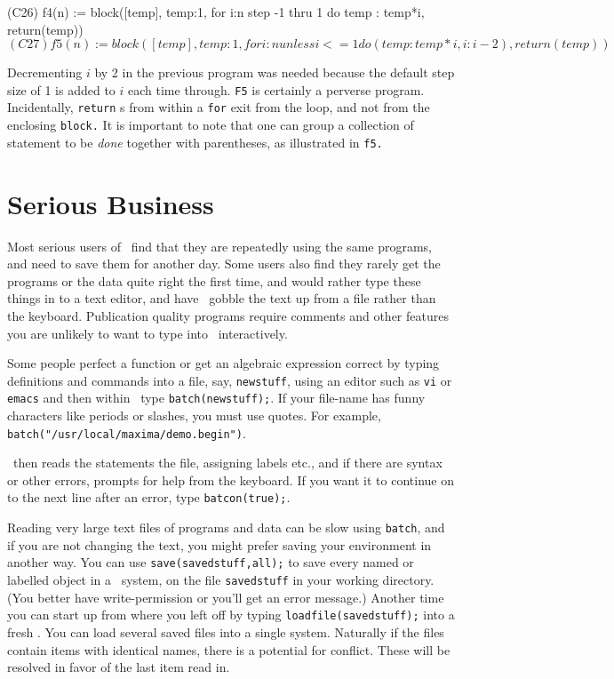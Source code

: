 (C26) f4(n) := block([temp],
                temp:1,
                for i:n step -1 thru 1 do temp : temp*i,
                return(temp))$

(C27) f5(n) := block([temp],
                temp:1,
                for i:n unless i <= 1 do (temp : temp*i , i:i-2),
                return(temp))$

\endmaximasession

Decrementing $i$ by 2 in the previous program was needed because the default
step size of 1 is added to $i$ each time through. {\tt F5}
is certainly
a perverse program.
Incidentally, {\tt return}
s from within a {\tt for}
exit from the loop, and not from
the enclosing 
{\tt block.}
It is important to
note that one can group a collection of statement to be {\it done} together
with parentheses, as illustrated in
{\tt f5.}

\section{Serious Business}

Most serious users of
\Max\
find that they are repeatedly using the same programs, and need to
save them for another day.  Some users also find they rarely get
the programs or the data quite right the first time, and would rather
type these things in to a text editor, and have
\Max\
gobble the text up from a file rather than the keyboard.
Publication quality programs require comments and other features you
are unlikely to want to type into
\Max\
interactively.

Some people perfect a function or get an algebraic
expression correct by typing definitions and commands into a file,
say, {\tt newstuff}, using an editor such as  {\tt vi}
or {\tt emacs}
and then within
\Max\
type {\tt batch(newstuff);}.  If your file-name has funny characters
like periods or slashes, you must use quotes. For example, {\tt batch("/usr/local/maxima/demo.begin")}.

\Max\
then reads the statements the file, assigning labels etc., and if there are syntax
or other errors, prompts for help from the keyboard.  If you want it
to continue on to the next line after an error, type {\tt batcon(true);}.

Reading very large text files of programs and data can be slow using
{\tt batch}, and if
you are not changing the text, you might prefer saving your environment
in another way.
You can use {\tt save(savedstuff,all);}
to save every named or labelled
object in a
\Max\
system, on the file 
{\tt savedstuff}
in your working directory.  
(You better have write-permission or you'll get an error message.)  Another
time you can start up from where you left off by typing
{\tt loadfile(savedstuff);}
into a fresh \Max.
You can load several saved files into a single system. Naturally if the
files contain items with identical names, there is a potential for
conflict. These will be resolved in favor of the last item read in.

